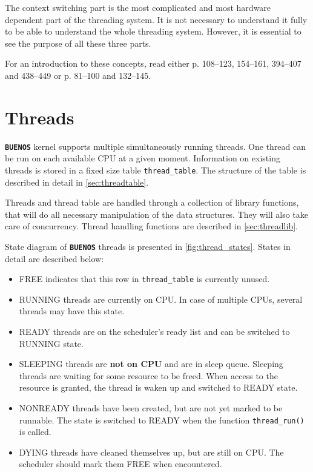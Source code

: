 \documentclass[twoside,a4paper]{report}
\newcommand{\buenos}{\texttt{\textbf{BUENOS}}}
\begin{document}
The context switching part is the most complicated and most hardware
dependent part of the threading system. It is not necessary to
understand it fully to be able to understand the whole threading
system. However, it is essential to see the purpose of all these three
parts.

For an introduction to these concepts, read either \cite{stallings} p.
108--123, 154--161, 394--407 and 438--449 or \cite{tanenbaum} p. 81--100
and 132--145.

\section{Threads}
\label{sec:threads}


\buenos{} kernel supports multiple simultaneously running threads. One
thread can be run on each available CPU at a given moment. Information
on existing threads is stored in a fixed size table
\texttt{thread\_table}. The structure of the table is described in
detail in \autoref{sec:threadtable}.

Threads and thread table are handled through a collection of library
functions, that will do all necessary manipulation of the data
structures. They will also take care of concurrency. Thread handling
functions are described in \autoref{sec:threadlib}.

State diagram of \buenos{} threads is presented in
\autoref{fig:thread_states}. States in detail are described below:


\begin{itemize}
\item FREE  indicates that this row in
  \texttt{thread\_table} is currently unused.

\item RUNNING  threads are currently
on CPU. In case of multiple CPUs, several threads may have this state.

\item READY  threads are on the
scheduler's ready list and can be switched to RUNNING state.
 
\item SLEEPING  threads are
\textbf{not on CPU} and are in sleep queue. Sleeping threads are
waiting for some resource to be freed. When access to the resource is
granted, the thread is waken up and switched to READY state.
 
\item NONREADY  threads have been
created, but are not yet marked to be runnable. The state is switched to
READY when the function \texttt{thread\_run()} is called.

\item DYING  threads have cleaned
themselves up, but are still on CPU. The scheduler should mark them FREE
when encountered.
\end{itemize}
\end{document}
